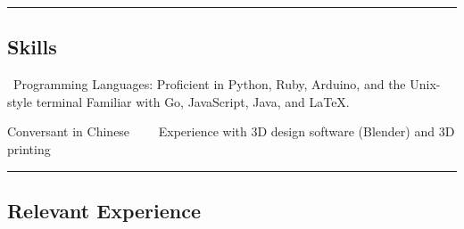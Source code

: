 \documentclass[10pt,letterpaper]{article}
\newenvironment{indentsection}[1]%
{\begin{list}{}%
	{\setlength{\leftmargin}{#1}}%
	\item[]%
}
{\end{list}}
\begin{document}
\hrule
\vspace{-0.2em}
\subsection*{Skills}

\begin{indentsection}{\parindent}
\begin{description*}
	\item[\textbullet \ Programming Languages:]
	Proficient in Python, Ruby, Arduino, and the Unix-style terminal \newline 
\hphantom{Programming Language} Familiar with Go, JavaScript, Java, and  \normalsize\LaTeX\normalsize.
	\item[\textbullet] Conversant in Chinese \ \ \textbullet \ \ Experience with 3D design software (Blender) and 3D printing
\end{description*}
\end{indentsection}

\hrule
\vspace{-0.2em}

\subsection*{Relevant Experience}
\end{document}
